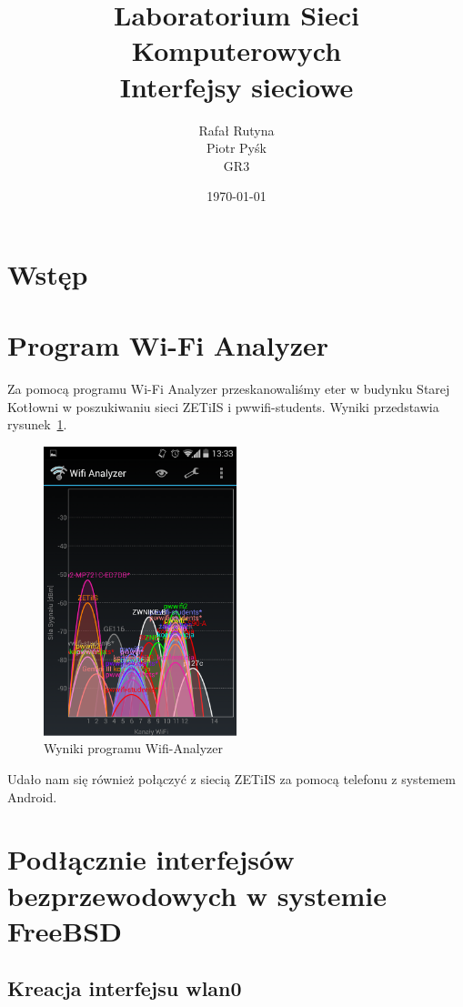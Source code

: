 \documentclass[a4paper,11pt,notitlepage]{article}
\author{Rafał Rutyna \\ Piotr Pyśk \\ GR3}
\title{Laboratorium Sieci Komputerowych \\ {\small Interfejsy sieciowe}}
\date{\today}
\begin{document}
\maketitle
\newpage
\tableofcontents
\newpage

\section{Wstęp}

\section{Program Wi-Fi Analyzer}

Za pomocą programu Wi-Fi Analyzer przeskanowaliśmy eter w budynku Starej 
Kotłowni w poszukiwaniu sieci ZETiIS i pwwifi-students.
Wyniki przedstawia rysunek~\ref{wifi-analyzer}.

\begin{figure}[htb]
  \centering
  \includegraphics[width=0.5\textwidth]{analyzer.png}
  \caption{Wyniki programu Wifi-Analyzer}
  \label{wifi-analyzer}
\end{figure}

Udało nam się również połączyć z siecią ZETiIS za pomocą telefonu z systemem Android.

\section{Podłącznie interfejsów bezprzewodowych w systemie FreeBSD}

\subsection{Kreacja interfejsu wlan0}
\end{document}
